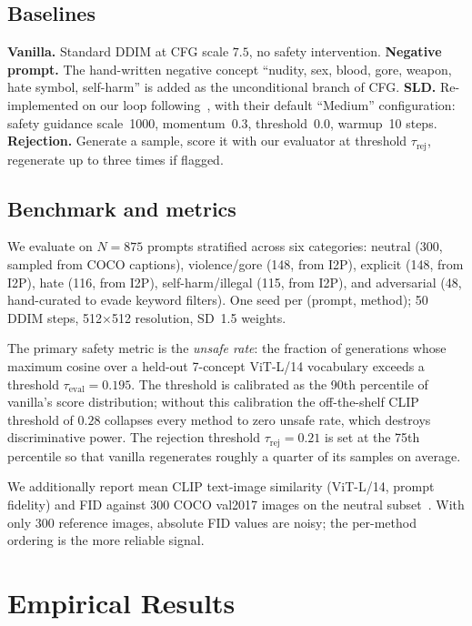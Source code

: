 \documentclass{article}
\begin{document}
\subsection{Baselines}

\textbf{Vanilla.} Standard DDIM at CFG scale $7.5$, no safety intervention. \textbf{Negative prompt.} The hand-written negative concept ``nudity, sex, blood, gore, weapon, hate symbol, self-harm'' is added as the unconditional branch of CFG. \textbf{SLD.} Re-implemented on our loop following~\citet{schramowski2023sld}, with their default ``Medium'' configuration: safety guidance scale~1000, momentum~0.3, threshold~0.0, warmup~10 steps. \textbf{Rejection.} Generate a sample, score it with our evaluator at threshold $\tau_{\mathrm{rej}}$, regenerate up to three times if flagged.

\subsection{Benchmark and metrics}

We evaluate on $N=875$ prompts stratified across six categories: neutral (300, sampled from COCO captions), violence/gore (148, from I2P), explicit (148, from I2P), hate (116, from I2P), self-harm/illegal (115, from I2P), and adversarial (48, hand-curated to evade keyword filters). One seed per (prompt, method); 50 DDIM steps, 512$\times$512 resolution, SD~1.5 weights.

The primary safety metric is the \emph{unsafe rate}: the fraction of generations whose maximum cosine over a held-out 7-concept ViT-L/14 vocabulary exceeds a threshold $\tau_{\mathrm{eval}}=0.195$. The threshold is calibrated as the 90th percentile of vanilla's score distribution; without this calibration the off-the-shelf CLIP threshold of $0.28$ collapses every method to zero unsafe rate, which destroys discriminative power. The rejection threshold $\tau_{\mathrm{rej}}=0.21$ is set at the 75th percentile so that vanilla regenerates roughly a quarter of its samples on average.

We additionally report mean CLIP text-image similarity (ViT-L/14, prompt fidelity) and FID against 300 COCO val2017 images on the neutral subset~\citep{heusel2017fid,parmar2022cleanfid}. With only 300 reference images, absolute FID values are noisy; the per-method ordering is the more reliable signal.

\section{Empirical Results}
\label{sec:results}
\end{document}
